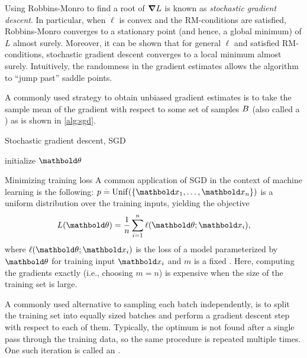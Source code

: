 Using Robbins-Monro to find a root of $\grad L$ is known as \emph{stochastic gradient descent}.
In particular, when $\ell$ is convex and the RM-conditions are satisfied, Robbins-Monro converges to a stationary point (and hence, a global minimum) of $L$ almost surely.
Moreover, it can be shown that for general $\ell$ and satisfied RM-conditions, stochastic gradient descent converges to a local minimum almost surely.
Intuitively, the randomness in the gradient estimates allows the algorithm to ``jump past'' saddle points.

A commonly used strategy to obtain unbiased gradient estimates is to take the sample mean of the gradient with respect to some set of samples $B$ (also called a ) as is shown in \cref{alg:sgd}.

\begin{algorithm}
  \caption{Stochastic gradient descent, SGD}\label{alg:sgd}
  initialize $\vtheta$\;
\end{algorithm}

\begin{ex}{Minimizing training loss}{}
  A common application of SGD in the context of machine learning is the following: $p \defeq \Unif{\{\vx_1, \dots, \vx_n\}}$ is a uniform distribution over the training inputs, yielding the objective \begin{align}
    L(\vtheta) = \frac{1}{n} \sum_{i=1}^n \ell(\vtheta; \vx_i),
  \end{align} where $\ell(\vtheta; \vx_i)$ is the loss of a model parameterized by $\vtheta$ for training input $\vx_i$ and $m$ is a fixed .
  Here, computing the gradients exactly (i.e., choosing $m = n$) is expensive when the size of the training set is large.

  A commonly used alternative to sampling each batch independently, is to split the training set into equally sized batches and perform a gradient descent step with respect to each of them.
  Typically, the optimum is not found after a single pass through the training data, so the same procedure is repeated multiple times. One such iteration is called an .
\end{ex}

